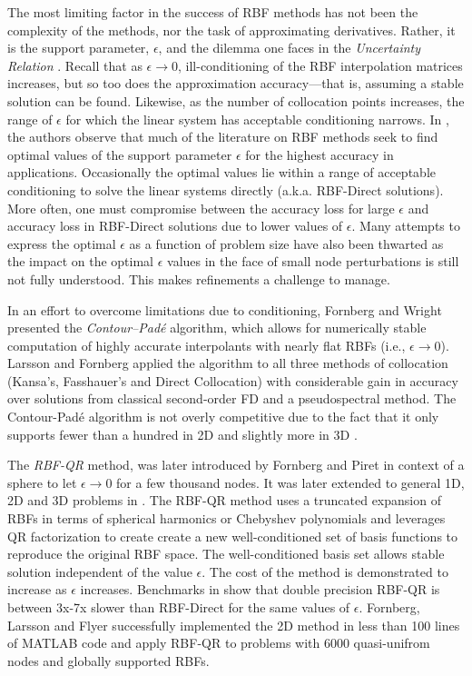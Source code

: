 \documentclass[11pt]{report}
\begin{document}
{The most limiting factor in the success of RBF methods has not been the complexity of the methods, nor the task of approximating derivatives. Rather, it is the support parameter, $\epsilon$, and the dilemma one faces in the \emph{Uncertainty Relation} \cite{Schaback1995}. Recall that as $\epsilon \rightarrow 0$, ill-conditioning of the RBF interpolation matrices increases, but so too does the approximation accuracy---that is, assuming a stable solution can be found. Likewise, as the number of collocation points increases, the range of $\epsilon$ for which the linear system has acceptable conditioning narrows. In \cite{Fornberg2011a}, the authors observe that much of the literature on RBF methods seek to find optimal values of the support parameter $\epsilon$ for the highest accuracy in applications. Occasionally the optimal values lie within a range of acceptable conditioning to solve the linear systems directly (a.k.a. RBF-Direct solutions). More often, one must compromise between the accuracy loss for large $\epsilon$ and accuracy loss in RBF-Direct solutions due to lower values of $\epsilon$. Many attempts to express the optimal $\epsilon$ as a function of problem size have also been thwarted as the impact on the optimal $\epsilon$ values in the face of small node perturbations is still not fully understood. This makes refinements a challenge to manage. 

In an effort to overcome limitations due to conditioning, Fornberg and Wright 
\cite{Fornberg2004} presented the \emph{Contour--Pad\'{e}} algorithm, which allows for numerically stable 
computation of highly 
accurate interpolants with nearly flat RBFs (i.e., $\epsilon \rightarrow 0$). Larsson and Fornberg \cite{Larsson2003} 
applied the 
algorithm to all three methods of collocation (Kansa's, Fasshauer's and Direct Collocation) with considerable gain in accuracy over solutions from classical second-order FD and a pseudospectral method.  
The Contour-Pad\'{e} 
algorithm is not overly competitive due to the fact that it only supports fewer than a hundred in 2D and slightly more in 3D \cite{Fornberg2012}. 

The \emph{RBF-QR} method, was later introduced by Fornberg  and 
Piret \cite{Fornberg2007} in context of a sphere to let $\epsilon \rightarrow 0$ for a few thousand nodes. It was later extended to general 1D, 2D and 3D problems in \cite{Fornberg2011a}. The 
RBF-QR 
method uses a truncated expansion of RBFs in terms of spherical harmonics or Chebyshev polynomials and leverages QR factorization to create create a new well-conditioned set of basis functions to reproduce the original RBF space. The well-conditioned basis set allows stable solution independent of the value $\epsilon$. The cost of the method is demonstrated to increase as $\epsilon$ increases. Benchmarks in \cite{Fornberg2011a} show that double precision RBF-QR is between 3x-7x slower than RBF-Direct for the same values of $\epsilon$. Fornberg, Larsson and Flyer \cite{Fornberg2011a} successfully implemented the 2D method in less than 100 lines of MATLAB code and apply RBF-QR to problems with 6000 quasi-unifrom nodes and globally supported RBFs. 


}
\end{document}
